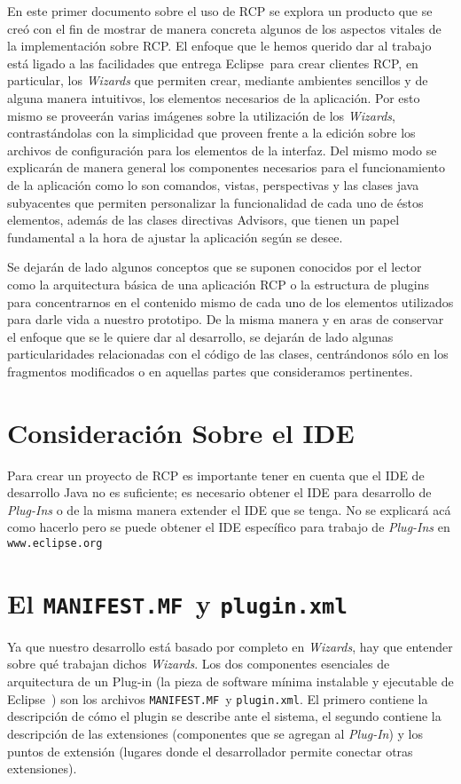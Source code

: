 \documentclass[journal]{IEEEtran}
\newcommand{\eclp}{\textsf{Eclipse~}}
\newcommand{\mnf}{\texttt{MANIFEST.MF~}}
\newcommand{\plgu}{\texttt{plugin.xml}}
\begin{document}
En este primer documento sobre el uso de RCP se explora un producto que se creó con el fin de mostrar de manera concreta 
algunos de los aspectos vitales de la implementación sobre RCP.
El enfoque que le hemos querido dar al trabajo está ligado a las facilidades que entrega \eclp para crear clientes 
RCP, en particular, los \textit{Wizards} que permiten crear, mediante ambientes sencillos y de alguna manera intuitivos, los elementos 
necesarios de la aplicación.
Por esto mismo se proveerán varias imágenes sobre la utilización de los \textit{Wizards}, contrastándolas con la simplicidad que proveen 
frente a la edición sobre los archivos de configuración para los elementos de la interfaz.
Del mismo modo se explicarán de manera general los componentes necesarios para el funcionamiento de la aplicación como lo son 
comandos, vistas, perspectivas y las clases java subyacentes que permiten personalizar la funcionalidad de cada uno de éstos 
elementos, además de las clases directivas Advisors, que tienen un papel fundamental a la hora de ajustar la aplicación según 
se desee.

Se dejarán de lado algunos conceptos que se suponen conocidos por el lector como la arquitectura básica de una aplicación RCP o 
la estructura de plugins para concentrarnos en el contenido mismo de cada uno de los elementos utilizados para darle vida a 
nuestro prototipo.
De la misma manera y en aras de conservar el enfoque que se le quiere dar al desarrollo, se dejarán de lado algunas 
particularidades relacionadas con el código de las clases, centrándonos sólo en los fragmentos modificados o en aquellas partes 
que consideramos pertinentes.


\section{Consideración Sobre el IDE}
Para crear un proyecto de RCP es importante tener en cuenta que el IDE de desarrollo Java no es suficiente; es 
necesario obtener el IDE para desarrollo de \textit{Plug-Ins} o de la misma manera extender el IDE que se tenga. No se explicará acá 
como hacerlo pero se puede obtener el IDE específico para trabajo de \textit{Plug-Ins} en \verb|www.eclipse.org|

\section{El \mnf y \plgu}
Ya que nuestro desarrollo está basado por completo en \textit{Wizards}, hay que entender sobre qué trabajan dichos \textit{Wizards}. Los dos 
componentes esenciales de arquitectura de un Plug-in (la pieza de software mínima instalable y ejecutable de \eclp) son los 
archivos \mnf y \plgu. El primero contiene la descripción de cómo el plugin se describe ante el sistema, el segundo contiene la 
descripción de las extensiones (componentes que se agregan al \textit{Plug-In}) y los puntos de extensión (lugares donde el desarrollador 
permite conectar otras extensiones). 
\end{document}
